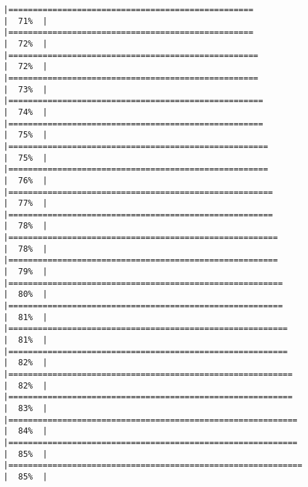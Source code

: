 \documentclass[
]{book}
\begin{document}
\begin{verbatim}
|==================================================                    |  71%  |                                                                              |==================================================                    |  72%  |                                                                              |===================================================                   |  72%  |                                                                              |===================================================                   |  73%  |                                                                              |====================================================                  |  74%  |                                                                              |====================================================                  |  75%  |                                                                              |=====================================================                 |  75%  |                                                                              |=====================================================                 |  76%  |                                                                              |======================================================                |  77%  |                                                                              |======================================================                |  78%  |                                                                              |=======================================================               |  78%  |                                                                              |=======================================================               |  79%  |                                                                              |========================================================              |  80%  |                                                                              |========================================================              |  81%  |                                                                              |=========================================================             |  81%  |                                                                              |=========================================================             |  82%  |                                                                              |==========================================================            |  82%  |                                                                              |==========================================================            |  83%  |                                                                              |===========================================================           |  84%  |                                                                              |===========================================================           |  85%  |                                                                              |============================================================          |  85%  |                                                                              
\end{verbatim}
\end{document}
